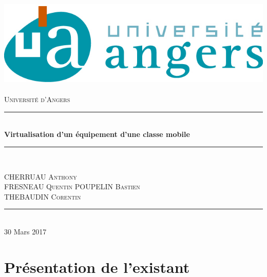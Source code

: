 \documentclass[a4paper,12pt]{extarticle}
\newcommand{\HRule}{\rule{\linewidth}{0.5mm}}
\begin{document}
\begin{titlepage}
  \begin{sffamily}
  \begin{center}

    \includegraphics[scale=1]{univangers.jpg}~\\[1.5cm]

    \textsc{\LARGE Université d'Angers}\\[2cm]

   

    \HRule \\[0.4cm]
    { \huge \bfseries Virtualisation d'un équipement d'une classe mobile}{\bfseries  \\[0.4cm] }

    \HRule \\[2cm]
    

    \begin{minipage}{0.4\textwidth}
      \begin{flushleft} \large
        CHERRUAU \textsc{Anthony}\\
        FRESNEAU \textsc{Quentin}
        POUPELIN \textsc{Bastien}\\
        THEBAUDIN \textsc{Corentin}
      \end{flushleft}
    \end{minipage}
    

    \vfill
    \HRule\\[2cm]
    {\large 30 Mars 2017}

  \end{center}
  \end{sffamily}
\end{titlepage}
\clearpage

\tableofcontents

\clearpage



\section{Présentation de l'existant}
\end{document}
